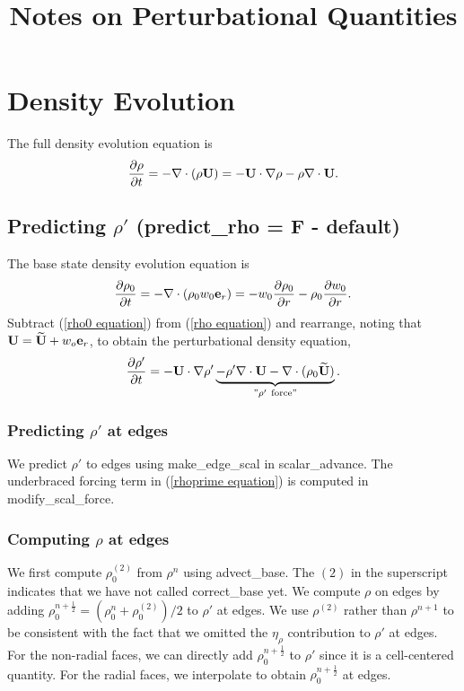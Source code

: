 \documentclass[11pt]{article}
\title{Notes on Perturbational Quantities}
\def\half  {\frac{1}{2}}
\def\eb    {{\bf e}}
\def\Ub    {{\bf U}}
\def\Ubt   {\widetilde{\bf U}}
\begin{document}
\maketitle
\tableofcontents
\cleardoublepage

\section{Density Evolution}
The full density evolution equation is
\begin{equation}
\frac{\partial\rho}{\partial t} = -\nabla\cdot(\rho\Ub) = -\Ub\cdot\nabla\rho 
- \rho\nabla\cdot\Ub. \label{rho equation}
\end{equation}
\subsection{Predicting $\rho'$ (predict\_rho = F - default)}
The base state density evolution equation is
\begin{equation}
\frac{\partial\rho_0}{\partial t} = -\nabla\cdot(\rho_0 w_0 \eb_r) = 
-w_0\frac{\partial\rho_0}{\partial r} - \rho_0\frac{\partial w_0}{\partial r}.
\label{rho0 equation}
\end{equation}
Subtract (\ref{rho0 equation}) from (\ref{rho equation}) and rearrange, noting that 
$\Ub = \Ubt + w_o\eb_r$, to obtain the perturbational density equation,
\begin{equation}
\frac{\partial\rho'}{\partial t} = -\Ub\cdot\nabla\rho' \underbrace{- \rho'\nabla\cdot\Ub 
- \nabla\cdot(\rho_0\Ubt)}_{"\rho' ~ \text{force}"}. 
\label{rhoprime equation}
\end{equation}
\subsubsection{Predicting $\rho'$ at edges}
We predict $\rho'$ to edges using make\_edge\_scal in scalar\_advance.  The underbraced 
forcing term in (\ref{rhoprime equation}) is computed in modify\_scal\_force.
\subsubsection{Computing $\rho$ at edges}\label{Computing rho at edges}
We first compute $\rho_0^{(2)}$ from $\rho^n$ using advect\_base.  The $(2)$ in the 
superscript indicates that we have not called correct\_base yet.  We compute $\rho$ on edges 
by adding $\rho_0^{n+\half} = (\rho_0^n + \rho_0^{(2)}) / 2$ to $\rho'$ at edges.  We use 
$\rho^{(2)}$ rather than $\rho^{n+1}$ to be consistent with the fact that we omitted the 
$\eta_\rho$ contribution to $\rho'$ at edges.  For the non-radial faces, we can directly add 
$\rho_0^{n+\half}$ to $\rho'$ since it is a cell-centered quantity.  For the radial faces, we 
interpolate to obtain $\rho_0^{n+\half}$ at edges.
\end{document}
